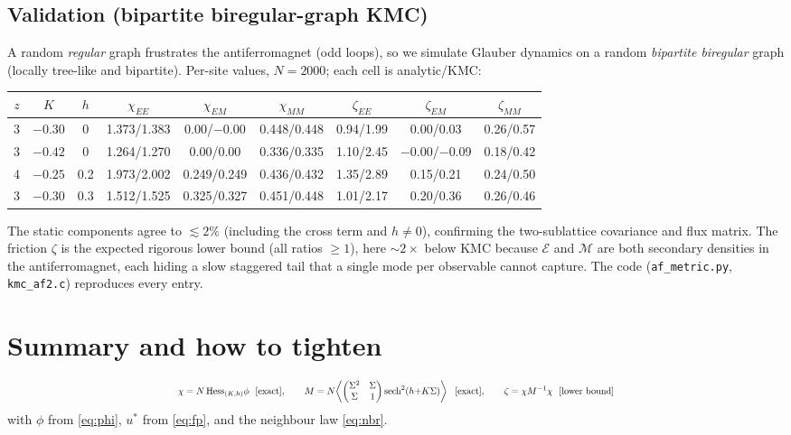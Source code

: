 \documentclass[11pt]{article}
\newcommand{\sech}{\operatorname{sech}}
\newcommand{\eq}{\mathcal{E}}
\newcommand{\mg}{\mathcal{M}}
\newcommand{\Sig}{\Sigma}
\begin{document}
\subsection{Validation (bipartite biregular-graph KMC)}
A random \emph{regular} graph frustrates the antiferromagnet (odd loops), so we simulate Glauber
dynamics on a random \emph{bipartite biregular} graph (locally tree-like and bipartite). Per-site values,
$N=2000$; each cell is analytic/KMC:

\begin{center}
\footnotesize
\begin{tabular}{ccc|ccc|ccc}
\toprule
$z$&$K$&$h$&$\chi_{EE}$&$\chi_{EM}$&$\chi_{MM}$&$\zeta_{EE}$&$\zeta_{EM}$&$\zeta_{MM}$\\
\midrule
3&$-0.30$&0   &1.373/1.383&0.00/$-$0.00&0.448/0.448&0.94/1.99&0.00/0.03&0.26/0.57\\
3&$-0.42$&0   &1.264/1.270&0.00/0.00&0.336/0.335&1.10/2.45&$-$0.00/$-$0.09&0.18/0.42\\
4&$-0.25$&0.2 &1.973/2.002&0.249/0.249&0.436/0.432&1.35/2.89&0.15/0.21&0.24/0.50\\
3&$-0.30$&0.3 &1.512/1.525&0.325/0.327&0.451/0.448&1.01/2.17&0.20/0.36&0.26/0.46\\
\bottomrule
\end{tabular}
\end{center}

The static components agree to $\lesssim2\%$ (including the cross term and $h\neq0$), confirming the
two-sublattice covariance and flux matrix. The friction $\zeta$ is the expected rigorous lower bound
(all ratios $\ge1$), here $\sim2\times$ below KMC because $\eq$ and $\mg$ are both secondary densities in
the antiferromagnet, each hiding a slow staggered tail that a single mode per observable cannot capture.
The code (\texttt{af\_metric.py}, \texttt{kmc\_af2.c}) reproduces every entry.


\section{Summary and how to tighten}

\begin{equation*}
\resizebox{\textwidth}{!}{$\displaystyle
\chi=N\,\mathrm{Hess}_{(K,h)}\phi\ \ [\text{exact}],\qquad
M=N\!\left\langle\begin{pmatrix}\Sig^2&\Sig\\\Sig&1\end{pmatrix}\sech^2(h{+}K\Sig)\right\rangle\ \ [\text{exact}],\qquad
\zeta=\chi M^{-1}\chi\ \ [\text{lower bound}]
$}
\end{equation*}
with $\phi$ from \eqref{eq:phi}, $u^*$ from \eqref{eq:fp}, and the neighbour law \eqref{eq:nbr}.
\end{document}
